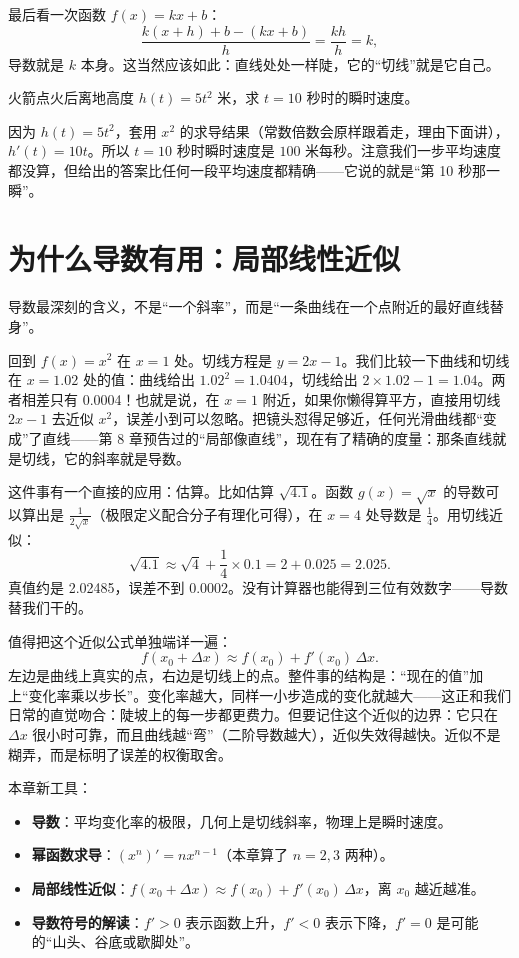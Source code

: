 最后看一次函数 $f(x)=kx+b$：
\[
\frac{k(x+h)+b-(kx+b)}{h}=\frac{kh}{h}=k,
\]
导数就是 $k$ 本身。这当然应该如此：直线处处一样陡，它的“切线”就是它自己。

\begin{li}
火箭点火后离地高度 $h(t)=5t^2$ 米，求 $t=10$ 秒时的瞬时速度。
\end{li}

因为 $h(t)=5t^2$，套用 $x^2$ 的求导结果（常数倍数会原样跟着走，理由下面讲），$h'(t)=10t$。所以 $t=10$ 秒时瞬时速度是 $100$ 米每秒。注意我们一步平均速度都没算，但给出的答案比任何一段平均速度都精确——它说的就是“第 10 秒那一瞬”。

\section{为什么导数有用：局部线性近似}

导数最深刻的含义，不是“一个斜率”，而是“一条曲线在一个点附近的最好直线替身”。

回到 $f(x)=x^2$ 在 $x=1$ 处。切线方程是 $y=2x-1$。我们比较一下曲线和切线在 $x=1.02$ 处的值：曲线给出 $1.02^2=1.0404$，切线给出 $2\times 1.02-1=1.04$。两者相差只有 0.0004！也就是说，在 $x=1$ 附近，如果你懒得算平方，直接用切线 $2x-1$ 去近似 $x^2$，误差小到可以忽略。把镜头怼得足够近，任何光滑曲线都“变成”了直线——第 8 章预告过的“局部像直线”，现在有了精确的度量：那条直线就是切线，它的斜率就是导数。

这件事有一个直接的应用：估算。比如估算 $\sqrt{4.1}$。函数 $g(x)=\sqrt{x}$ 的导数可以算出是 $\frac{1}{2\sqrt{x}}$（极限定义配合分子有理化可得），在 $x=4$ 处导数是 $\frac{1}{4}$。用切线近似：
\[
\sqrt{4.1}\approx \sqrt{4}+\frac{1}{4}\times 0.1=2+0.025=2.025.
\]
真值约是 2.02485，误差不到 0.0002。没有计算器也能得到三位有效数字——导数替我们干的。

值得把这个近似公式单独端详一遍：
\[
f(x_0+\Delta x)\approx f(x_0)+f'(x_0)\,\Delta x.
\]
左边是曲线上真实的点，右边是切线上的点。整件事的结构是：“现在的值”加上“变化率乘以步长”。变化率越大，同样一小步造成的变化就越大——这正和我们日常的直觉吻合：陡坡上的每一步都更费力。但要记住这个近似的边界：它只在 $\Delta x$ 很小时可靠，而且曲线越“弯”（二阶导数越大），近似失效得越快。近似不是糊弄，而是标明了误差的权衡取舍。

\begin{toolbox}
本章新工具：
\begin{itemize}
  \item \textbf{导数}：平均变化率的极限，几何上是切线斜率，物理上是瞬时速度。
  \item \textbf{幂函数求导}：$(x^n)'=nx^{n-1}$（本章算了 $n=2,3$ 两种）。
  \item \textbf{局部线性近似}：$f(x_0+\Delta x)\approx f(x_0)+f'(x_0)\,\Delta x$，离 $x_0$ 越近越准。
  \item \textbf{导数符号的解读}：$f'>0$ 表示函数上升，$f'<0$ 表示下降，$f'=0$ 是可能的“山头、谷底或歇脚处”。
\end{itemize}
\end{toolbox}

